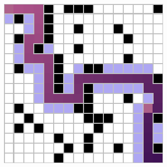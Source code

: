 \documentclass[letter]{article}
\begin{document}
\begin{questions}
\begin{figure}
		\caption{}\label{fig:q2-8}
		\endminipage\hfill
		\includegraphics[width=\linewidth]{../pics/16/DFS checkFringe 41 39 35.png}
		\caption{}\label{fig:q2-9}
		\endminipage
	\end{figure}


\end{questions}
\end{document}
